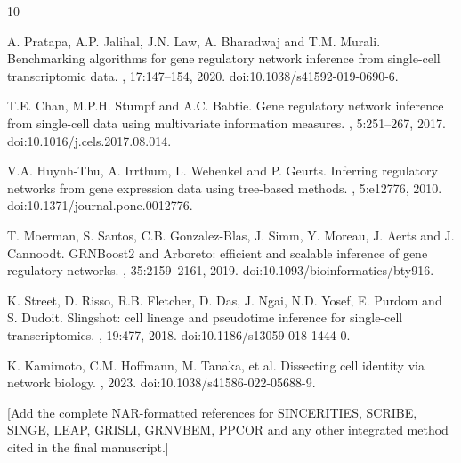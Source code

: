 \documentclass[unnumsec,webpdf,modern,large]{oup-authoring-template}%
\begin{document}
\begin{thebibliography}{10}

A. Pratapa, A.P. Jalihal, J.N. Law, A. Bharadwaj and T.M. Murali.
\newblock Benchmarking algorithms for gene regulatory network inference from single-cell transcriptomic data.
, 17:147--154, 2020. doi:10.1038/s41592-019-0690-6.

T.E. Chan, M.P.H. Stumpf and A.C. Babtie.
\newblock Gene regulatory network inference from single-cell data using multivariate information measures.
, 5:251--267, 2017. doi:10.1016/j.cels.2017.08.014.

V.A. Huynh-Thu, A. Irrthum, L. Wehenkel and P. Geurts.
\newblock Inferring regulatory networks from gene expression data using tree-based methods.
, 5:e12776, 2010. doi:10.1371/journal.pone.0012776.

T. Moerman, S. Santos, C.B. Gonzalez-Blas, J. Simm, Y. Moreau, J. Aerts and J. Cannoodt.
\newblock GRNBoost2 and Arboreto: efficient and scalable inference of gene regulatory networks.
, 35:2159--2161, 2019. doi:10.1093/bioinformatics/bty916.

K. Street, D. Risso, R.B. Fletcher, D. Das, J. Ngai, N.D. Yosef, E. Purdom and S. Dudoit.
\newblock Slingshot: cell lineage and pseudotime inference for single-cell transcriptomics.
, 19:477, 2018. doi:10.1186/s13059-018-1444-0.

K. Kamimoto, C.M. Hoffmann, M. Tanaka, et al.
\newblock Dissecting cell identity via network biology.
, 2023. doi:10.1038/s41586-022-05688-9.

[Add the complete NAR-formatted references for SINCERITIES, SCRIBE, SINGE, LEAP, GRISLI, GRNVBEM, PPCOR and any other integrated method cited in the final manuscript.]

\end{thebibliography}
\end{document}
